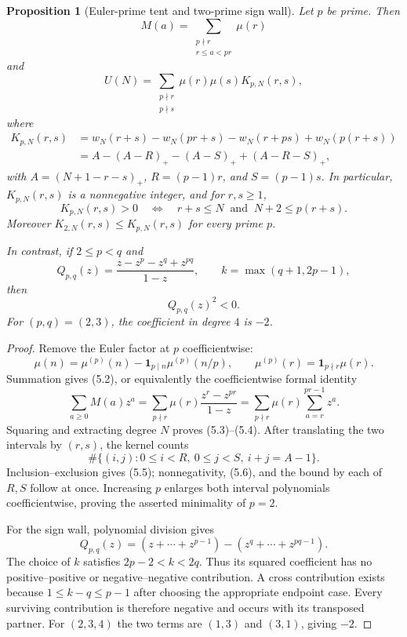 \documentclass[11pt]{article}
\newtheorem{proposition}[theorem]{Proposition}
\theoremstyle{remark}
\begin{document}
\begin{proposition}[Euler-prime tent and two-prime sign wall]
\label{prop:prime-tent}
Let $p$ be prime.  Then
\begin{equation}
 M(a)=\sum_{\substack{p\nmid r\\r\leq a<pr}}\mu(r)                 \tag{5.2}
\end{equation}
and
\begin{equation}
 U(N)=\sum_{\substack{p\nmid r\\p\nmid s}}\mu(r)\mu(s)
 K_{p,N}(r,s),                                                    \tag{5.3}
\end{equation}
where
\begin{align}
 K_{p,N}(r,s)
 &=w_N(r+s)-w_N(pr+s)-w_N(r+ps)+w_N(p(r+s))                       \tag{5.4}\\
 &=A-(A-R)_+-(A-S)_++(A-R-S)_+,                                  \tag{5.5}
\end{align}
with $A=(N+1-r-s)_+$, $R=(p-1)r$, and $S=(p-1)s$.  In particular,
$K_{p,N}(r,s)$ is a nonnegative integer, and for $r,s\geq1$,
\begin{equation}
 K_{p,N}(r,s)>0
 \quad\Longleftrightarrow\quad
 r+s\leq N\ \text{ and }\ N+2\leq p(r+s).                       \tag{5.6}
\end{equation}
Moreover $K_{2,N}(r,s)\leq K_{p,N}(r,s)$ for every prime $p$.

In contrast, if $2\leq p<q$ and
\[
 Q_{p,q}(z)=\frac{z-z^p-z^q+z^{pq}}{1-z},
 \qquad k=\max(q+1,2p-1),
\]
then
\begin{equation}
 [z^k]Q_{p,q}(z)^2<0.                                             \tag{5.7}
\end{equation}
For $(p,q)=(2,3)$, the coefficient in degree $4$ is $-2$.
\end{proposition}

\begin{proof}
Remove the Euler factor at $p$ coefficientwise:
\[
 \mu(n)=\mu^{(p)}(n)-\mathbf 1_{p\mid n}\mu^{(p)}(n/p),
 \qquad
 \mu^{(p)}(r)=\mathbf 1_{p\nmid r}\mu(r).
\]
Summation gives (5.2), or equivalently the coefficientwise formal identity
\[
 \sum_{a\geq0}M(a)z^a
 =\sum_{p\nmid r}\mu(r)\frac{z^r-z^{pr}}{1-z}
 =\sum_{p\nmid r}\mu(r)\sum_{a=r}^{pr-1}z^a.
\]
Squaring and extracting degree $N$ proves (5.3)--(5.4).  After translating the two intervals by
$(r,s)$, the kernel counts
\[
 \#\{(i,j):0\leq i<R,\ 0\leq j<S,\ i+j=A-1\}.
\]
Inclusion--exclusion gives (5.5); nonnegativity, (5.6), and the bound by each of $R,S$ follow at
once.  Increasing $p$ enlarges both interval polynomials coefficientwise, proving the asserted
minimality of $p=2$.

For the sign wall, polynomial division gives
\[
 Q_{p,q}(z)=(z+\cdots+z^{p-1})-(z^q+\cdots+z^{pq-1}).
\]
The choice of $k$ satisfies $2p-2<k<2q$.  Thus its squared coefficient has no
positive--positive or negative--negative contribution.  A cross contribution exists because
$1\leq k-q\leq p-1$ after choosing the appropriate endpoint case.  Every surviving contribution
is therefore negative and occurs with its transposed partner.  For $(2,3,4)$ the two terms are
$(1,3)$ and $(3,1)$, giving $-2$.
\end{proof}
\end{document}

